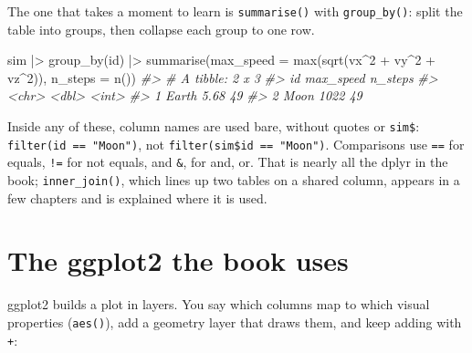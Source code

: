 \documentclass[
  10.5pt,
  letterpaper,
]{scrbook}
\newenvironment{Shaded}{\begin{snugshade}}{\end{snugshade}}
\newcommand{\AttributeTok}[1]{\textcolor[rgb]{0.00,0.00,0.00}{#1}}
\newcommand{\CommentTok}[1]{\textcolor[rgb]{0.00,0.00,0.00}{\textit{#1}}}
\newcommand{\DecValTok}[1]{\textcolor[rgb]{0.00,0.00,0.00}{#1}}
\newcommand{\FunctionTok}[1]{\textcolor[rgb]{0.00,0.00,0.00}{#1}}
\newcommand{\NormalTok}[1]{\textcolor[rgb]{0.00,0.00,0.00}{#1}}
\newcommand{\SpecialCharTok}[1]{\textcolor[rgb]{0.00,0.00,0.00}{#1}}
\theoremstyle{plain}
\theoremstyle{remark}
\begin{document}
The one that takes a moment to learn is \texttt{summarise()} with
\texttt{group\_by()}: split the table into groups, then collapse each
group to one row.

\begin{Shaded}
\begin{Highlighting}[]
\NormalTok{sim }\SpecialCharTok{|\textgreater{}}
  \FunctionTok{group\_by}\NormalTok{(id) }\SpecialCharTok{|\textgreater{}}
  \FunctionTok{summarise}\NormalTok{(}\AttributeTok{max\_speed =} \FunctionTok{max}\NormalTok{(}\FunctionTok{sqrt}\NormalTok{(vx}\SpecialCharTok{\^{}}\DecValTok{2} \SpecialCharTok{+}\NormalTok{ vy}\SpecialCharTok{\^{}}\DecValTok{2} \SpecialCharTok{+}\NormalTok{ vz}\SpecialCharTok{\^{}}\DecValTok{2}\NormalTok{)),}
            \AttributeTok{n\_steps   =} \FunctionTok{n}\NormalTok{())}
\CommentTok{\#\textgreater{} \# A tibble: 2 x 3}
\CommentTok{\#\textgreater{}   id    max\_speed n\_steps}
\CommentTok{\#\textgreater{}   \textless{}chr\textgreater{}     \textless{}dbl\textgreater{}   \textless{}int\textgreater{}}
\CommentTok{\#\textgreater{} 1 Earth      5.68      49}
\CommentTok{\#\textgreater{} 2 Moon    1022         49}
\end{Highlighting}
\end{Shaded}

Inside any of these, column names are used bare, without quotes or
\texttt{sim\$}: \texttt{filter(id\ ==\ "Moon")}, not
\texttt{filter(sim\$id\ ==\ "Moon")}. Comparisons use \texttt{==} for
equals, \texttt{!=} for not equals, and \texttt{\&}, \texttt{\textbar{}}
for and, or. That is nearly all the dplyr in the book;
\texttt{inner\_join()}, which lines up two tables on a shared column,
appears in a few chapters and is explained where it is used.

\section{The ggplot2 the book uses}\label{the-ggplot2-the-book-uses}

ggplot2 builds a plot in layers. You say which columns map to which
visual properties (\texttt{aes()}), add a geometry layer that draws
them, and keep adding with \texttt{+}:
\end{document}
